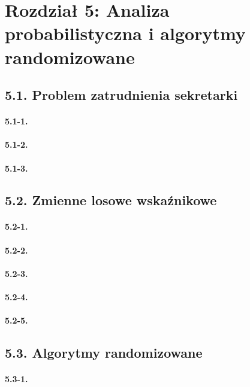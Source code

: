 \section*{Rozdział 5: Analiza probabilistyczna i algorytmy randomizowane}

\subsection*{5.1. Problem zatrudnienia sekretarki}

\paragraph{5.1-1.}
\paragraph{5.1-2.}
\paragraph{5.1-3.}

\subsection*{5.2. Zmienne losowe wskaźnikowe}

\paragraph{5.2-1.}
\paragraph{5.2-2.}
\paragraph{5.2-3.}
\paragraph{5.2-4.}
\paragraph{5.2-5.}

\subsection*{5.3. Algorytmy randomizowane}

\paragraph{5.3-1.}
